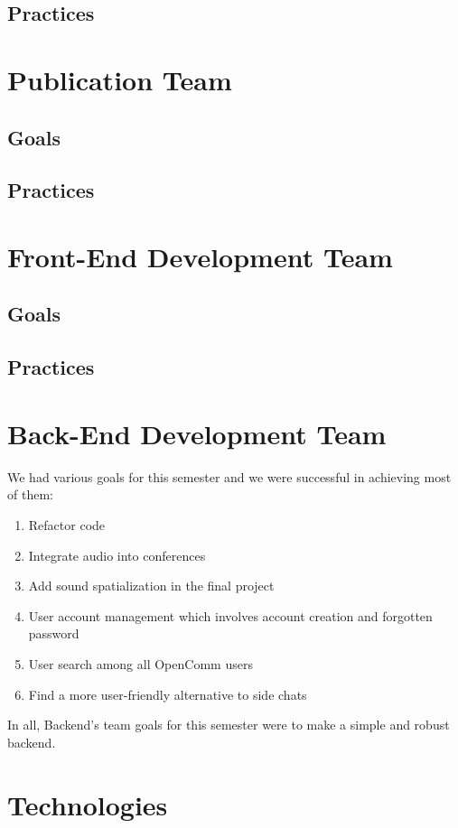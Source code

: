 \documentclass[12pt, letterpaper]{article}
\begin{document}
\subsection{Practices}

\section{Publication Team}
\subsection{Goals}
\subsection{Practices}

\section{Front-End Development Team}
\subsection{Goals}
\subsection{Practices}

\section{Back-End Development Team}
We had various goals for this semester and we were successful in achieving most of them:
\begin{enumerate}
\item Refactor code
\item Integrate audio into conferences
\item Add sound spatialization in the final project
\item User account management which involves account creation and forgotten password
\item User search among all OpenComm users
\item Find a more user-friendly alternative to side chats
\end{enumerate}

In all, Backend’s team goals for this semester were to make a simple and robust backend. 

\section{Technologies}
\end{document}
